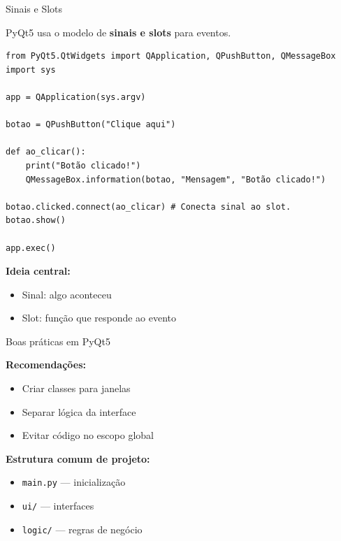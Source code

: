 \documentclass{beamer}
\begin{document}
    \begin{frame}[fragile]{Sinais e Slots}
        
        PyQt5 usa o modelo de \textbf{sinais e slots} para eventos.
        
        \vspace{0.3cm}
        
        \begin{verbatim}
from PyQt5.QtWidgets import QApplication, QPushButton, QMessageBox
import sys

app = QApplication(sys.argv)

botao = QPushButton("Clique aqui")

def ao_clicar():
    print("Botão clicado!")
    QMessageBox.information(botao, "Mensagem", "Botão clicado!")

botao.clicked.connect(ao_clicar) # Conecta sinal ao slot.
botao.show()

app.exec()
        \end{verbatim}
        
        \vspace{0.3cm}
        
        \textbf{Ideia central:}
        \begin{itemize}
            \item Sinal: algo aconteceu
            \item Slot: função que responde ao evento
        \end{itemize}
        
    \end{frame}
    
    \begin{frame}{Boas práticas em PyQt5}
        
        \textbf{Recomendações:}
        \begin{itemize}
            \item Criar classes para janelas
            \item Separar lógica da interface
            \item Evitar código no escopo global
        \end{itemize}
        
        \vspace{0.3cm}
        
        \textbf{Estrutura comum de projeto:}
        \begin{itemize}
            \item \texttt{main.py} — inicialização
            \item \texttt{ui/} — interfaces
            \item \texttt{logic/} — regras de negócio
        \end{itemize}
        
    \end{frame}
    
\end{document}
